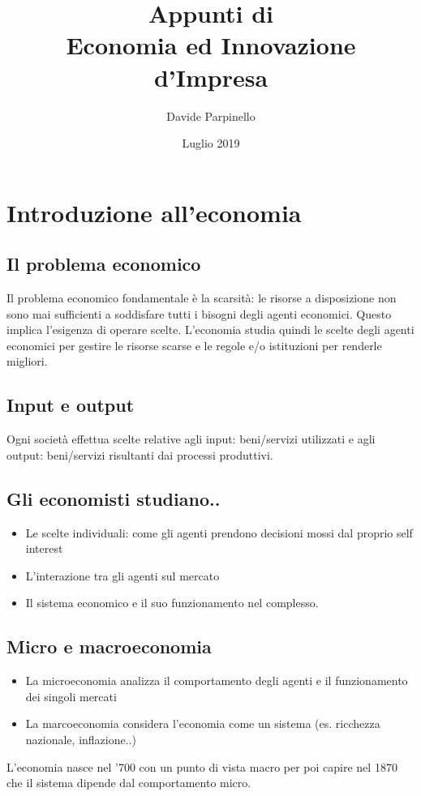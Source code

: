 \documentclass{report}
\begin{document}
	
	\author{Davide Parpinello}
	\title{%
			Appunti di\\
		\large Economia ed Innovazione d'Impresa}
	\date{Luglio 2019}
	\maketitle
	
	\tableofcontents
	
	\chapter{Introduzione all'economia}
	\section{Il problema economico}
	Il problema economico fondamentale è la scarsità: le risorse a disposizione non sono mai sufficienti a soddisfare tutti i bisogni degli agenti economici.
	Questo implica l'esigenza di operare scelte. L'economia studia quindi le scelte degli agenti economici per gestire le risorse scarse e le regole e/o istituzioni per renderle migliori.
	\section{Input e output}
	Ogni società effettua scelte relative agli input: beni/servizi utilizzati e agli output: beni/servizi risultanti dai processi produttivi.
	\section{Gli economisti studiano..}
	\begin{itemize}
		\item Le scelte individuali: come gli agenti prendono decisioni mossi dal proprio self interest
		\item L'interazione tra gli agenti sul mercato
		\item Il sistema economico e il suo funzionamento nel complesso.
	\end {itemize}
	\section{Micro e macroeconomia}
	\begin{itemize}
		\item La microeconomia analizza il comportamento degli agenti e il funzionamento dei singoli mercati
		\item La marcoeconomia considera l'economia come un sistema (es. ricchezza nazionale, inflazione..)
	\end {itemize}
	L'economia nasce nel '700 con un punto di vista macro per poi capire nel 1870 che il sistema dipende dal comportamento micro.
\end{document}
